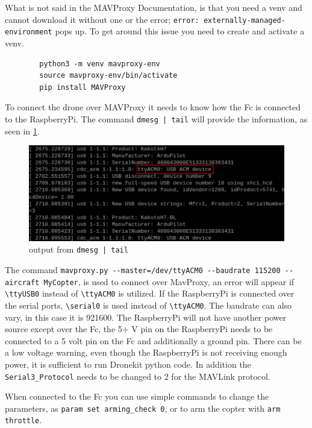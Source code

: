 \documentclass[svgnames]{article}
\begin{document}
	What is not said in the MAVProxy Documentation, is that you need a \gls{venv} and cannot download it without one or the error; \lstinline|error: externally-managed-environment| pops up. To get around this issue you need to create and activate a \gls{venv}.
	\begin{lstlisting}
		python3 -m venv mavproxy-env
		source mavproxy-env/bin/activate
		pip install MAVProxy
	\end{lstlisting} 
	
	
	To connect the drone over MAVProxy it needs to know how the \gls{Fc} is connected to the RaspberryPi. The command \lstinline!dmesg | tail! will provide the information, as seen in \cref{fig:usbrasppiconectrectangle}.

\begin{figure}[th]
	\centering
	\includegraphics[width=0.7\linewidth]{pictures/USBRaspPiconect_rectangle}
	\caption{output from \lstinline!dmesg | tail!}
	\label{fig:usbrasppiconectrectangle}
\end{figure}

	
	The command \lstinline|mavproxy.py --master=/dev/ttyACM0 --baudrate 115200 --aircraft MyCopter|, is used to connect over MavProxy, an error will appear if \lstinline|\ttyUSB0| instead of \lstinline|\ttyACM0| is utilized. If the RaspberryPi is connected over the serial ports, \lstinline|\serial0| is used instead of \lstinline|\ttyACM0|. The baudrate can also vary, in this case it is 921600. The RaspberryPi will not have another power source except over the \gls{Fc}, the 5+ V pin on the RaspberryPi needs to be connected to a 5 volt pin on the \gls{Fc} and additionally a ground pin. There can be a low voltage warning, even though the RaspberryPi is not receiving enough power, it is sufficient to run Dronekit python code. In addition the \lstinline|Serial3_Protocol| needs to be changed to 2 for the MAVLink protocol.
	
	When connected to the \gls{Fc} you can use simple commands to change the parameters, as \lstinline|param set arming_check 0|, or to arm the copter with \lstinline|arm throttle|.
	
\end{document}
